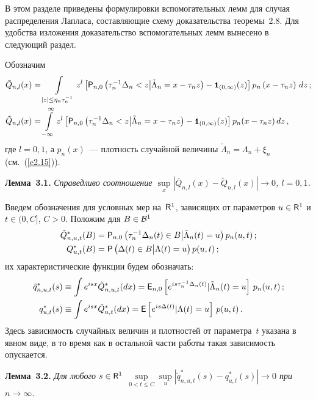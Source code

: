 В этом разделе приведены формулировки вспомогательных лемм для
случая распределения Лапласа, составляющие схему доказательства
теоремы~2.8. Для удобства изложения доказательство вспомогательных
лемм вынесено в следующий раздел.

Обозначим
\begin{align*}
\bar Q_{n,l}(x)&=
\int\limits_{|z|\leq\eta_n\tau_n^{-1}} z^{l}
\left[{{\sf P}}_{n,0}\left(\tau_n^{-1}\Delta_n < z\big| \tilde\Lambda_n=x-\tau_nz\right)-
{\mbox{{\small \tt {1}}\hspace{-1.5mm}{\tt 1}}}_{(0,\infty)}(z)\right]p_n\left(x-\tau_nz\right)\,dz\,;\\
\tilde Q_{n,l}(x)&=\int\limits_{-\infty}^{\infty} z^{l}\left[{{\sf P}}_{n,0}
\left(\tau_n^{-1}\Delta_n < z\big| \tilde\Lambda_n=x-\tau_nz\right)-
{\mbox{{\small \tt {1}}\hspace{-1.5mm}{\tt 1}}}_{(0,\infty)}(z)\right]p_n(x-\tau_nz)\,dz\,,
\end{align*}
где $l=0,1$, а $p_n(x)$~--- плотность случайной величины
$\tilde \Lambda_n=\Lambda_n+\xi_n$ (см.~(\ref{e2.15})).

\medskip

\noindent
\textbf{Лемма~3.1.} {\it Справедливо соотношение
$
\sup\limits_{x} \left|\bar Q_{n,l}(x)-\tilde Q_{n,l}(x) \right|\rightarrow 0$, $l=0,1$.}

\medskip

Введем обозначения для условных мер на~${\sf R}^1$, зависящих от параметров 
$u\in{\sf R}^1$ и $t\in(0,C]$, $C>0$. Положим для $B\in{\cal B}^1$
\begin{align*}
\tilde Q_{n,u,t}^{*}(B)&={{\sf P}}_{n,0}\left(\tau_n^{-1}\Delta_n(t) \in B\big| \tilde\Lambda_n(t)=u\right)p_n(u,t)\,;
\\
Q_{u,t}^{*}(B)&={{\sf P}}\left(\Delta(t) \in B\big| \Lambda(t)=u\right)p(u,t)\,;
\end{align*}
их характеристические функции будем обозначать:
\begin{align*}
\tilde q_{n,u,t}^{*}(s)&\equiv \int e^{isx}\tilde Q_{n,u,t}^{*}(dx)
={{\sf E}}_{n,0}\left[ e^{is\tau_n^{-1}\Delta_n(t)}\vert \tilde\Lambda_n(t)=u\right]\,p_n(u,t)\,;
\\
q_{u,t}^{*}(s)&\equiv \int e^{isx}\tilde Q_{u,t}^{*}(dx)=
{{\sf E}}\left[ e^{is\Delta(t)}\vert \Lambda(t)=u\right]\,p(u,t)\,.
\end{align*}
Здесь зависимость случайных величин и плотностей от параметра~$t$ 
указана в явном виде, в то время как в остальной части работы такая зависимость опускается.

\medskip

\noindent
\textbf{Лемма~3.2.} {\it Для любого $s\in{\sf R}^1$
$
\sup\limits_{0<t\leq C}\sup\limits_{u}\left|
\tilde q_{n,u,t}^{*}(s)-q_{u,t}^{*}(s)  \right|\longrightarrow0$ при  $n\rightarrow\infty$.
}

